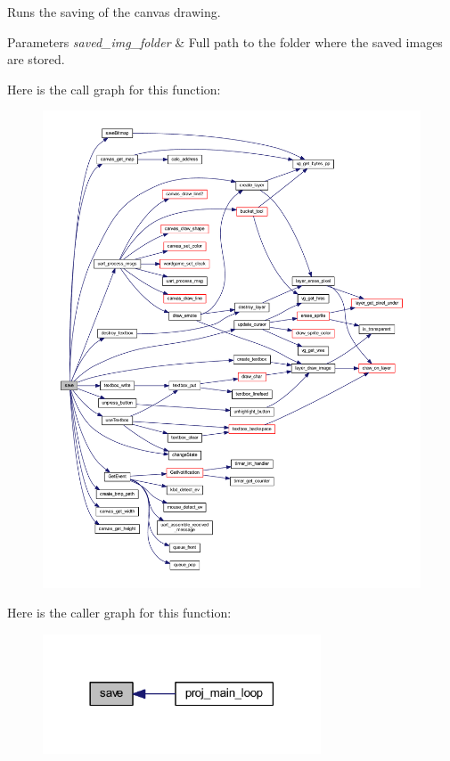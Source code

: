 Runs the saving of the canvas drawing. 


\begin{DoxyParams}{Parameters}
{\em saved\+\_\+img\+\_\+folder} & Full path to the folder where the saved images are stored. \\
\hline
\end{DoxyParams}
Here is the call graph for this function\+:\nopagebreak
\begin{figure}[H]
\begin{center}
\leavevmode
\includegraphics[width=350pt]{group__pengoo_ga7be478ae067a8e77c79ece6af6082ce5_cgraph}
\end{center}
\end{figure}
Here is the caller graph for this function\+:\nopagebreak
\begin{figure}[H]
\begin{center}
\leavevmode
\includegraphics[width=234pt]{group__pengoo_ga7be478ae067a8e77c79ece6af6082ce5_icgraph}
\end{center}
\end{figure}
\mbox{\label{group__pengoo_gab4e279f31fb3e6e034e2b173aaa1a2fb}} 
